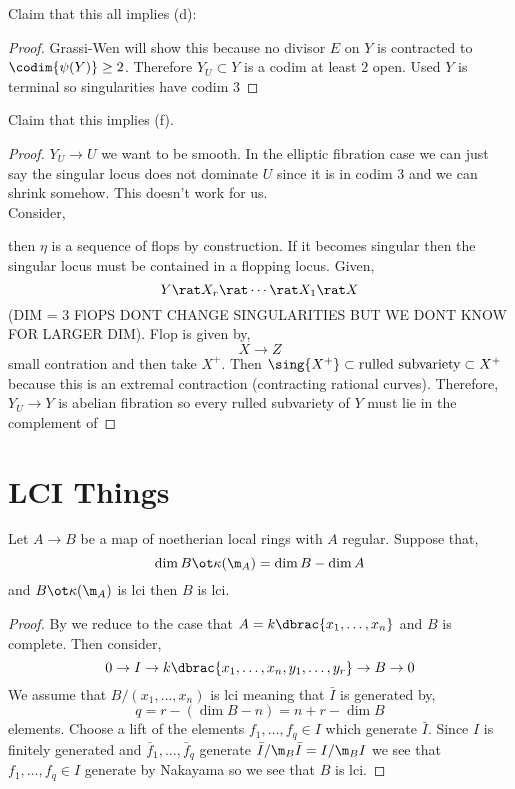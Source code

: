 \documentclass[12pt]{article}
\begin{document}
Claim that this all implies (d):

\begin{proof}
Grassi-Wen will show this because no divisor $E$ on $Y$ is contracted to $\codim{\psi(Y)} \ge 2$. Therefore $Y_U \subset Y$ is a codim at least $2$ open. Used $Y$ is terminal so singularities have codim $3$
\end{proof}

Claim that this implies (f). 

\begin{proof}
$Y_U \to U$ we want to be smooth. In the elliptic fibration case we can just say the singular locus does not dominate $U$ since it is in codim $3$ and we can shrink somehow. This doesn't work for us.
\bigskip\\
Consider,
\begin{center}
\end{center}
then $\eta$ is a sequence of flops by construction. If it becomes singular then the singular locus must be contained in a flopping locus. Given,
\[ Y \rat X_r \rat \cdots \rat X_1 \rat X \]
(DIM = 3 FlOPS DONT CHANGE SINGULARITIES BUT WE DONT KNOW FOR LARGER DIM). Flop is given by,
\[ X \to Z \]
small contration and then take $X^+$. Then $\sing{X^+} \subset \text{rulled subvariety} \subset X^+$ because this is an extremal contraction (contracting rational curves). Therefore, $Y_U \to Y$ is abelian fibration so every rulled subvariety of $Y$ must lie in the complement of 
\end{proof}

\section{LCI Things}

\begin{lemma}
Let $A \to B$ be a map of noetherian local rings with $A$ regular. Suppose that,
\[ \dim{B \ot \kappa(\m_A)} = \dim{B} - \dim{A} \]
and $B \ot \kappa(\m_A)$ is lci then $B$ is lci.
\end{lemma}

\begin{proof}
By  we reduce to the case that $A = k\dbrac{x_1, \dots, x_n}$ and $B$ is complete. Then consider,
\[ 0 \to I \to k\dbrac{x_1, \dots, x_n, y_1, \dots, y_r} \to B \to 0 \]
We assume that $B / (x_1, \dots, x_n)$ is lci meaning that $\bar{I}$ is generated by,
\[ q = r - (\dim{B} - n) = n + r - \dim{B} \]
elements. Choose a lift of the elements $f_1, \dots, f_q \in I$ which generate $\bar{I}$. Since $I$ is finitely generated and $\bar{f}_1, \dots, \bar{f}_q$ generate $\bar{I} / \m_B \bar{I} = I / \m_B I$ we see that $f_1, \dots, f_q \in I$ generate by Nakayama so we see that $B$ is lci. 
\end{proof}
\end{document}
